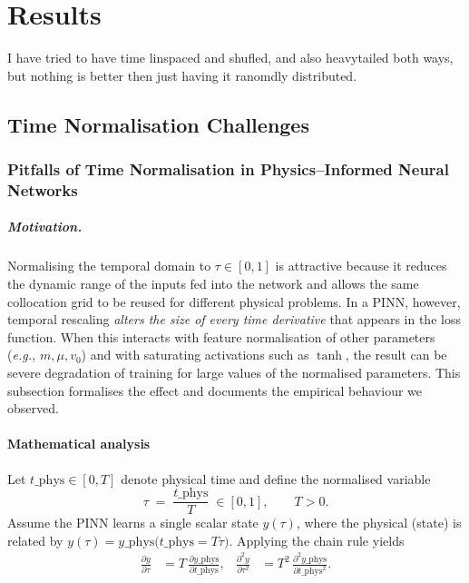 \chapter{Results}
\label{ch:results}

I have tried to have time linspaced and shufled, and also heavytailed both ways, but nothing is better then just having it ranomdly distributed. 

\section{Time Normalisation Challenges}
\label{sec:time_norm_challenges}

\subsection{Pitfalls of Time Normalisation in Physics--Informed Neural Networks}
\label{sec:time_norm_pinn}

\paragraph{Motivation.}
Normalising the temporal domain to $\tau\in[0,1]$ is attractive because it
reduces the dynamic range of the inputs fed into the network and allows the
same collocation grid to be reused for different physical problems.  
In a PINN, however, temporal rescaling \emph{alters the size of every time
derivative} that appears in the loss function.  When this interacts with
feature normalisation of other parameters (\textit{e.g.,} $m,\mu,v_0$) and with
saturating activations such as $\tanh$, the result can be
severe degradation of training for large values of the normalised
parameters.  This subsection formalises the effect and documents the empirical
behaviour we observed.

\subsubsection{Mathematical analysis}

Let $t\_{\text{phys}}\in[0,T]$ denote physical time and define the normalised
variable
\begin{equation}
 \tau \;=\;\frac{t\_{\text{phys}}}{T}\;\in[0,1],\qquad T>0.
 \label{eq:tau_def}
\end{equation}
Assume the PINN learns a single scalar state $y(\tau)$, where the physical
(state) is related by
$y(\tau)=y\_{\text{phys}}\!\bigl(t\_{\text{phys}}=T\tau\bigr)$.
Applying the chain rule yields
\begin{align}
 \frac{\partial y}{\partial\tau} &= T\,\frac{\partial
 y\_{\text{phys}}}{\partial t\_{\text{phys}}}, &
 \frac{\partial^2 y}{\partial\tau^{2}} &= T^{2}\,
 \frac{\partial^{2}y\_{\text{phys}}}{\partial t\_{\text{phys}}^{2}}.
 \label{eq:chain_rule}
\end{align}

